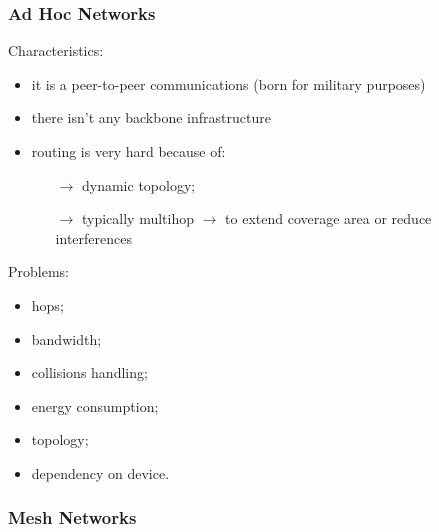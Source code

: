 \subsubsection{Ad Hoc Networks}

Characteristics:
\begin{itemize}
    \item it is a peer-to-peer communications (born for military purposes)
    \item there isn't any backbone infrastructure
    \item routing is very hard because of:
    \begin{itemize}
        \item[$\rightarrow$] dynamic topology;
        \item[$\rightarrow$] typically multihop $\rightarrow$ to
        extend coverage area or reduce interferences
    \end{itemize}
\end{itemize}

Problems:
\begin{multicols}{2}
\begin{itemize}
    \item hops;
    \item bandwidth;
    \item collisions handling;
\end{itemize}
\begin{itemize}
    \item energy consumption;
    \item topology;
    \item dependency on device.
\end{itemize}
\end{multicols}

\subsubsection{Mesh Networks}

